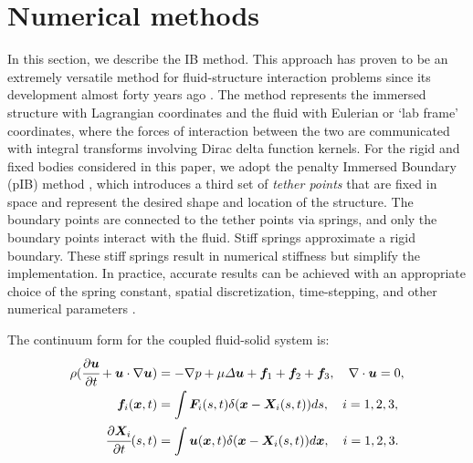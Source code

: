 \documentclass{jfm}
\newcommand{\charles}[1]{\todo[inline,color=blue!40]{Charles: #1}}
\begin{document}
\section{Numerical methods} \label{sec:numerical}
In this section, we describe the IB method. This approach has proven to be an extremely versatile method for fluid-structure interaction problems since its development almost forty years ago \citep{peskin1972flow,mcqueen1997shared,arthurs1998modeling,lai2000immersed,griffith2009simulating,balboa2011staggered,devendran2012immersed,sanaei2021flight}. The method represents the immersed structure with Lagrangian coordinates and the fluid with Eulerian or `lab frame' coordinates, where the forces of interaction between the two are communicated with integral transforms involving Dirac delta function kernels. For the rigid and fixed bodies considered in this paper, we adopt the penalty Immersed Boundary (pIB) method \citep{kim2016penalty,sanaei2021flight}, which introduces a third set of \textit{tether points} that are fixed in space and represent the desired shape and location of the structure. The boundary points are connected to the tether points via springs, and only the boundary points interact with the fluid. Stiff springs approximate a rigid boundary. These stiff springs result in numerical stiffness but simplify the implementation. In practice, accurate results can be achieved with an appropriate choice of the spring constant, spatial discretization, time-stepping, and other numerical parameters \citep{kim2016penalty}. 

The continuum form for the coupled fluid-solid system is:
\begin{align}
\rho(\cfrac{\partial\bm{u}}{\partial t}+\bm{u}\cdot\nabla\bm{u}) & =-\nabla p+\mu\varDelta\bm{u}+\bm{f}_1+\bm{f}_2+\bm{f}_3,\quad
\nabla\cdot\bm{u}=0, \label{eq:ib-ns}\\
\bm{f}_i(\bm{x},t) & = \int \bm{F}_i(s,t)\delta(\bm{x}-\bm{X}_i(s,t))ds, \quad i = 1,2,3, \label{eq:ib-spread-force}\\
\cfrac{\partial\bm{X}_i}{\partial t}(s,t) & =\int\bm{u}(\bm{x},t)\delta(\bm{x}-\bm{X}_i(s,t))d\bm{x}, \quad i = 1,2,3. \label{eq:ib-advect}
\end{align}
\end{document}
